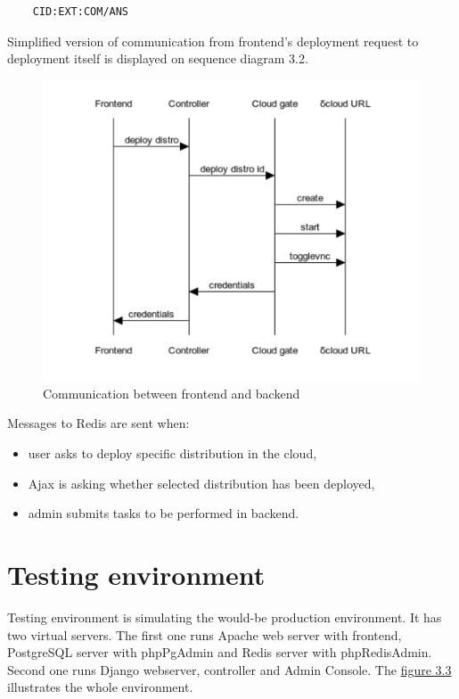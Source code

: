\documentclass[thesis=B,english]{FITthesis}[2013/04/26]
\begin{document}
\begin{center}
	\begin{verbatim}
	CID:EXT:COM/ANS
	\end{verbatim}
\end{center}

Simplified version of communication from frontend's deployment request to deployment itself is displayed on sequence diagram 3.2.

\begin{center}
\begin{figure}[h!]
	\includegraphics[totalheight=295pt]{images/sequence.pdf}
	\caption{Communication between frontend and backend}
	\label{fig: sequence}
\end{figure}
\end{center}

Messages to Redis are sent when:

\begin{itemize}
	\item user asks to deploy specific distribution in the cloud,
	\item Ajax is asking whether selected distribution has been deployed,
	\item admin submits tasks to be performed in backend.
\end{itemize}

\section{Testing environment}
\label{section:testing}
Testing environment is simulating the would-be production environment. It has two virtual servers. The first one runs Apache web server with frontend, PostgreSQL server with phpPgAdmin and Redis server with phpRedisAdmin. Second one runs Django webserver, controller and Admin Console. The \hyperref[fig: tndw-test]{figure 3.3} illustrates the whole environment.
\end{document}
